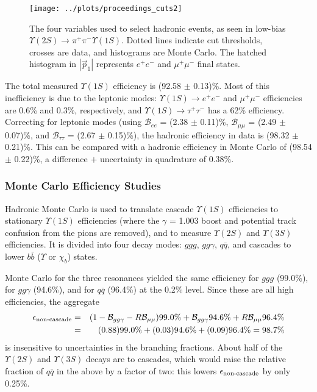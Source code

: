 \documentclass[aps,prd,preprint,superscriptaddress,tightenlines,nofootinbib,floatfix]{revtex4}
\begin{document}
\begin{figure}[p]
  \texttt{[image: ../plots/proceedings\_cuts2]}
  \caption{\label{fig:cuts} The four variables used to select hadronic
    events, as seen in low-bias $\Upsilon(2S) \to \pi^+\pi^-
    \Upsilon(1S)$.  Dotted lines indicate cut thresholds, crosses are
    data, and histograms are Monte Carlo.  The hatched histogram in
    $|\vec{p}_1|$ represents $e^+e^-$ and $\mu^+\mu^-$ final states.}
\end{figure}

The total measured $\Upsilon(1S)$ efficiency is (92.58 $\pm$ 0.13)\%.
Most of this inefficiency is due to the leptonic modes: $\Upsilon(1S)
\to e^+e^-$ and $\mu^+\mu^-$ efficiencies are 0.6\% and 0.3\%,
respectively, and $\Upsilon(1S) \to \tau^+\tau^-$ has a 62\%
efficiency.  Correcting for leptonic modes (using $\mathcal{B}_{ee}$ =
(2.38 $\pm$ 0.11)\%, $\mathcal{B}_{\mu\mu}$ = (2.49 $\pm$ 0.07)\%, and
$\mathcal{B}_{\tau\tau}$ = (2.67 $\pm$ 0.15)\%), the hadronic
efficiency in data is (98.32 $\pm$ 0.21)\%.  This can be compared with
a hadronic efficiency in Monte Carlo of (98.54 $\pm$ 0.22)\%, a
difference $+$ uncertainty in quadrature of 0.38\%.

%
\subsubsection{Monte Carlo Efficiency Studies}
%

Hadronic Monte Carlo is used to translate cascade $\Upsilon(1S)$
efficiencies to stationary $\Upsilon(1S)$ efficiencies (where the
$\gamma$ = 1.003 boost and potential track confusion from the pions
are removed), and to measure $\Upsilon(2S)$ and $\Upsilon(3S)$
efficiencies.  It is divided into four decay modes: $ggg$, $gg\gamma$,
$q\bar{q}$, and cascades to lower $b\bar{b}$ ($\Upsilon$ or $\chi_b$)
states.

Monte Carlo for the three resonances yielded the same efficiency for
$ggg$ (99.0\%), for $gg\gamma$ (94.6\%), and for $q\bar{q}$ (96.4\%)
at the 0.2\% level.  Since these are all high efficiencies, the
aggregate
\begin{eqnarray}
  \epsilon_{\mbox{\scriptsize non-cascade}} &=&
  (1-\mathcal{B}_{gg\gamma}-R\mathcal{B}_{\mu\mu}) 99.0\% +
  \mathcal{B}_{gg\gamma} 94.6\% + R\mathcal{B}_{\mu\mu} 96.4\% \\
  &=& (0.88) 99.0\% + (0.03) 94.6\% + (0.09) 96.4\% = 98.7\%
\end{eqnarray}
is insensitive to uncertainties in the branching fractions.  About
half of the $\Upsilon(2S)$ and $\Upsilon(3S)$ decays are to cascades,
which would raise the relative fraction of $q\bar{q}$ in the above by
a factor of two: this lowers $\epsilon_{\mbox{\scriptsize non-cascade}}$ by only
0.25\%.
\end{document}
